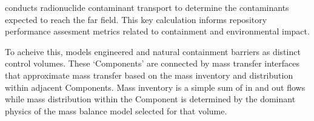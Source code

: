 \Cyder conducts radionuclide contaminant transport to determine the 
contaminants expected to reach the far field. This key calculation 
informs repository performance assesment metrics related to containment and 
environmental impact.

To acheive this, \Cyder models engineered and natural 
containment barriers as distinct control volumes. These `Components' are 
connected by mass transfer interfaces that approximate mass transfer based on 
the mass inventory and distribution within adjacent Components. Mass inventory 
is a simple sum of in and out flows while mass distribution within the 
Component is determined by the dominant physics of the mass balance model selected 
for that volume.  

